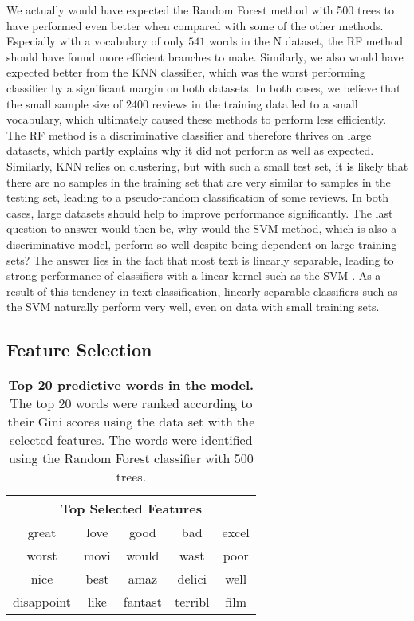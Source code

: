 \documentclass{article} %
\begin{document}
We actually would have expected the Random Forest method with 500 trees to have performed even better when compared with some of the other methods. Especially with a vocabulary of only $541$ words in the N dataset, the RF method should have found more efficient branches to make. Similarly, we also would have expected better from the KNN classifier, which was the worst performing classifier by a significant margin on both datasets. In both cases, we believe that the small sample size of $2400$ reviews in the training data led to a small vocabulary, which ultimately caused these methods to perform less efficiently. The RF method is a discriminative classifier and therefore thrives on large datasets, which partly explains why it did not perform as well as expected. Similarly, KNN relies on clustering, but with such a small test set, it is likely that there are no samples in the training set that are very similar to samples in the testing set, leading to a pseudo-random classification of some reviews. In both cases, large datasets should help to improve performance significantly. The last question to answer would then be, why would the SVM method, which is also a discriminative model, perform so well despite being dependent on large training sets? The answer lies in the fact that most text is linearly separable, leading to strong performance of classifiers with a linear kernel such as the SVM \cite{svm}. As a result of this tendency in text classification, linearly separable classifiers such as the SVM naturally perform very well, even on data with small training sets.

\subsection{Feature Selection}
\begin{table}[htb]
\begin{center}
\begin{tabular}{|c|c|c|c|c|} 
 \hline
\multicolumn{5}{|c|}{Top Selected Features} \\
\hline\hline
great	 & love &	good	 & bad &	excel \\
\hline
worst & movi &	would & wast &	poor \\
\hline
nice & best &	amaz & delici &	well \\
\hline
disappoint & like & fantast & terribl &	film \\
\hline
\end{tabular}
\caption{\label{tab:fs}\textbf{Top 20 predictive words in the model.} The top 20 words were ranked according to their Gini scores using the data set with the selected features. The words were identified using the Random Forest classifier with 500 trees.}
\end{center}
\end{table}
\end{document}

